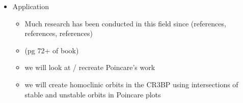 \documentclass{article}
\begin{document}
\begin{itemize}
\begin{itemize}
	  \end{itemize}
	\item Application
	  \begin{itemize}
	  	\item \color{red}Much research has been conducted in this field since (references, references, references)\color{black}
	  	\item (pg 72+ of book)
	  	\item we will look at / recreate Poincare's work
	  	\item we will create homoclinic orbits in the CR3BP using intersections of stable and unstable orbits in Poincare plots
	  \end{itemize}
\end{itemize}

\cite{KoonLoMarsdenRoss2011}


\end{document}
